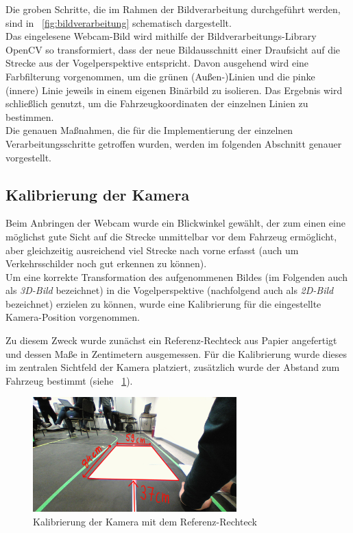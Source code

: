 Die groben Schritte, die im Rahmen der Bildverarbeitung durchgef\"uhrt werden, sind in
\figurename\ \ref{fig:bildverarbeitung} schematisch dargestellt.\\
Das eingelesene Webcam-Bild wird mithilfe der Bildverarbeitungs-Library OpenCV\cite{OCV} so transformiert, dass
der neue Bildausschnitt einer Draufsicht auf die Strecke aus der Vogelperspektive entspricht.
Davon ausgehend wird eine Farbfilterung vorgenommen, um die gr\"unen (Au\ss en-)Linien und die
pinke (innere) Linie jeweils in einem eigenen Bin\"arbild zu isolieren. Das Ergebnis wird
schlie\ss lich genutzt, um die Fahrzeugkoordinaten der einzelnen Linien zu bestimmen.\\
Die genauen Ma\ss nahmen, die f\"ur die Implementierung der einzelnen Verarbeitungsschritte getroffen 
wurden, werden im folgenden Abschnitt genauer vorgestellt.


\subsection{Kalibrierung der Kamera}
\label{subsec:kalibrierung}

Beim Anbringen der Webcam wurde ein Blickwinkel gew\"ahlt, der zum einen eine m\"oglichst gute Sicht auf die
Strecke unmittelbar vor dem Fahrzeug erm\"oglicht, aber gleichzeitig ausreichend viel Strecke nach
vorne erfasst (auch um Verkehrsschilder noch gut erkennen zu k\"onnen).\\
Um eine korrekte Transformation des aufgenommenen Bildes (im Folgenden auch als \textit{3D-Bild} bezeichnet)
in die Vogelperspektive (nachfolgend auch als \textit{2D-Bild} bezeichnet) erzielen zu
k\"onnen, wurde eine Kalibrierung f\"ur die eingestellte Kamera-Position vorgenommen.

Zu diesem Zweck wurde zun\"achst ein Referenz-Rechteck aus Papier angefertigt und dessen Ma\ss e
in Zentimetern ausgemessen.
F\"ur die Kalibrierung wurde dieses im zentralen Sichtfeld der Kamera platziert, zus\"atzlich wurde der
Abstand zum Fahrzeug bestimmt (siehe \figurename\ \ref{fig:testrechteck}).

\begin{figure}[h]
	\centering
	\includegraphics[width = 0.7\textwidth]{images/Testrechteck.png}
	\caption{Kalibrierung der Kamera mit dem Referenz-Rechteck}
	\label{fig:testrechteck}
\end{figure}

